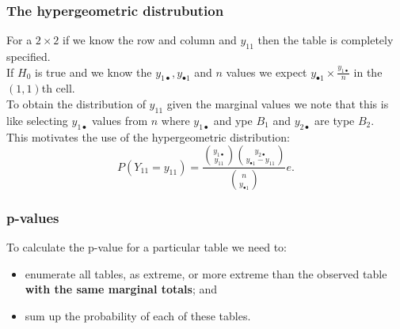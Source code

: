 \documentclass[a4paper]{article}\usepackage[]{graphicx}\usepackage[]{xcolor}
\begin{document}
\subsubsection{The hypergeometric distrubution}
For a \( 2 \times 2 \) if we know the row and column and \( y_{11} \) then the table is completely specified.\\
If \( H_0 \) is true and we know the \( y_{1\bullet}, y_{\bullet1} \) and \( n \) values we expect \( y_{\bullet1} \times \frac{y_{1\bullet}}{n} \) in the \( (1,1) \)th cell.\\
To obtain the distribution of \( y_{11} \) given the marginal values we note that this is like selecting \( y_{1\bullet} \) values from \( n \) where \( y_{1\bullet} \) and ype \( B_1 \) and \( y_{2\bullet} \) are type \( B_2 \).\\
This motivates the use of the hypergeometric distribution:
\[
	P(Y_{11} = y_{11}) = \frac{\binom{y_{1 \bullet}}{y_{11}}\binom{y_{2 \bullet}}{y_{\bullet 1} - y_{11}}}{\binom{n}{y_{\bullet 1}}}e.
\]
\subsubsection{p-values}
To calculate the p-value for a particular table we need to:
\begin{itemize}
	\item enumerate all tables, as extreme, or more extreme than the observed table \textbf{with the same marginal totals}; and
	\item sum up the probability of each of these tables.
\end{itemize}
\end{document}
